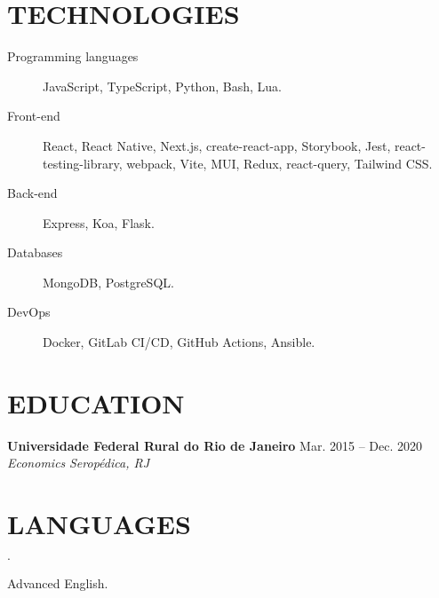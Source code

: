 \documentclass[12pt]{article}
\newenvironment{tightlist}
  {\begin{list}
    {$\cdot$}
    {
      \setlength{\leftmargin}{0em}
      \setlength{\itemsep}{\smallskipamount}
    }
  }
{\end{list}}
\begin{document}
\section*{TECHNOLOGIES}

\begin{description}
  \item[Programming languages] JavaScript, TypeScript, Python, Bash, Lua.
  \item[Front-end] React, React Native, Next.js, create-react-app,
    Storybook, Jest, react-testing-library, webpack, Vite,
    MUI, Redux, react-query, Tailwind CSS.
  \item[Back-end] Express, Koa, Flask.
  \item[Databases] MongoDB, PostgreSQL.
  \item[DevOps] Docker, GitLab CI/CD, GitHub Actions, Ansible.
\end{description}

\section*{EDUCATION}

\textbf{Universidade Federal Rural do Rio de Janeiro} \hfill {Mar. 2015 -- Dec. 2020} \\
\textit{Economics} \hfill \textit{Seropédica, RJ} {\parfillskip=0pt\par}

\section*{LANGUAGES}

\begin{tightlist}
  \item Advanced English.
\end{tightlist}
\end{document}
